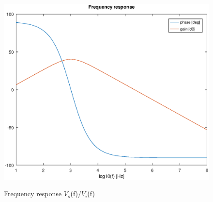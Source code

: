 \begin{figure}[!ht] \centering
\caption{Frequency response $V_o$(f)/$V_i$(f)}
\includegraphics[width=0.8\linewidth]{theory.eps}
\label{fig:theoretical}
\end{figure}


  






